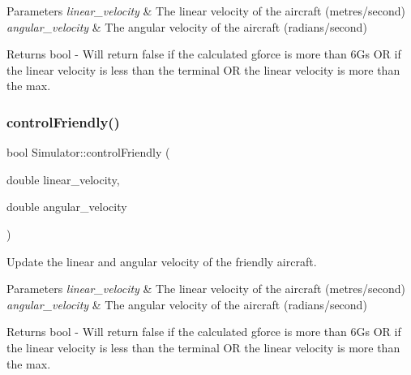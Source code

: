 \begin{DoxyParams}{Parameters}
{\em linear\+\_\+velocity} & The linear velocity of the aircraft (metres/second) \\
\hline
{\em angular\+\_\+velocity} & The angular velocity of the aircraft (radians/second)\\
\hline
\end{DoxyParams}
\begin{DoxyReturn}{Returns}
bool -\/ Will return false if the calculated gforce is more than 6G\textquotesingle{}s OR if the linear velocity is less than the terminal OR the linear velocity is more than the max. 
\end{DoxyReturn}
\mbox{\label{classSimulator_adb1cff57466c3b03fd738036cb9cee63}} 
\subsubsection{\texorpdfstring{control\+Friendly()}{controlFriendly()}\hspace{0.1cm}{\footnotesize\ttfamily [2/2]}}
{\footnotesize\ttfamily bool Simulator\+::control\+Friendly (\begin{DoxyParamCaption}\item[{double}]{linear\+\_\+velocity,  }\item[{double}]{angular\+\_\+velocity }\end{DoxyParamCaption})}



Update the linear and angular velocity of the friendly aircraft. 


\begin{DoxyParams}{Parameters}
{\em linear\+\_\+velocity} & The linear velocity of the aircraft (metres/second) \\
\hline
{\em angular\+\_\+velocity} & The angular velocity of the aircraft (radians/second)\\
\hline
\end{DoxyParams}
\begin{DoxyReturn}{Returns}
bool -\/ Will return false if the calculated gforce is more than 6G\textquotesingle{}s OR if the linear velocity is less than the terminal OR the linear velocity is more than the max. 
\end{DoxyReturn}
\mbox{\label{classSimulator_ab21eff1f7776080c591765f099c2fb7e}} 
